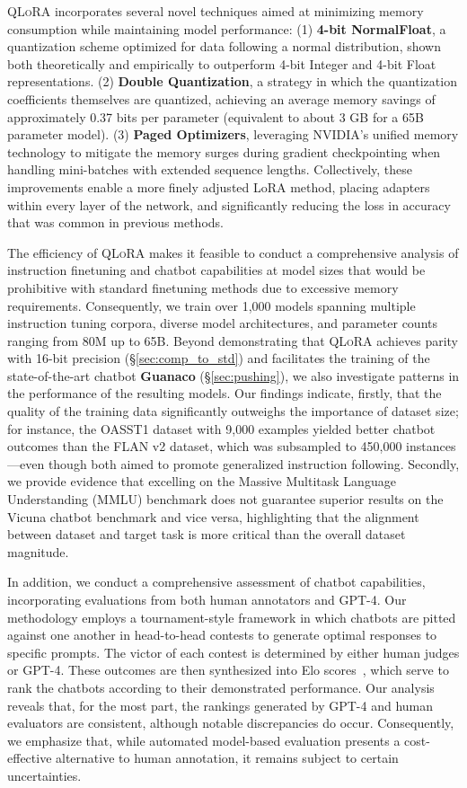 \textsc{QLoRA} incorporates several novel techniques aimed at minimizing memory consumption while maintaining model performance: (1) \textbf{4-bit NormalFloat}, a quantization scheme optimized for data following a normal distribution, shown both theoretically and empirically to outperform 4-bit Integer and 4-bit Float representations. (2) \textbf{Double Quantization}, a strategy in which the quantization coefficients themselves are quantized, achieving an average memory savings of approximately 0.37 bits per parameter (equivalent to about 3 GB for a 65B parameter model). (3) \textbf{Paged Optimizers}, leveraging NVIDIA’s unified memory technology to mitigate the memory surges during gradient checkpointing when handling mini-batches with extended sequence lengths. Collectively, these improvements enable a more finely adjusted LoRA method, placing adapters within every layer of the network, and significantly reducing the loss in accuracy that was common in previous methods.

The efficiency of \textsc{QLoRA} makes it feasible to conduct a comprehensive analysis of instruction finetuning and chatbot capabilities at model sizes that would be prohibitive with standard finetuning methods due to excessive memory requirements. Consequently, we train over 1,000 models spanning multiple instruction tuning corpora, diverse model architectures, and parameter counts ranging from 80M up to 65B. Beyond demonstrating that \textsc{QLoRA} achieves parity with 16-bit precision (\S\ref{sec:comp_to_std}) and facilitates the training of the state-of-the-art chatbot \textbf{Guanaco} (\S\ref{sec:pushing}), we also investigate patterns in the performance of the resulting models. Our findings indicate, firstly, that the quality of the training data significantly outweighs the importance of dataset size; for instance, the OASST1 dataset with 9,000 examples yielded better chatbot outcomes than the FLAN v2 dataset, which was subsampled to 450,000 instances—even though both aimed to promote generalized instruction following. Secondly, we provide evidence that excelling on the Massive Multitask Language Understanding (MMLU) benchmark does not guarantee superior results on the Vicuna chatbot benchmark and vice versa, highlighting that the alignment between dataset and target task is more critical than the overall dataset magnitude.

In addition, we conduct a comprehensive assessment of chatbot capabilities, incorporating evaluations from both human annotators and GPT-4. Our methodology employs a tournament-style framework in which chatbots are pitted against one another in head-to-head contests to generate optimal responses to specific prompts. The victor of each contest is determined by either human judges or GPT-4. These outcomes are then synthesized into Elo scores~\citep{elo1967proposed, elo1978rating}, which serve to rank the chatbots according to their demonstrated performance. Our analysis reveals that, for the most part, the rankings generated by GPT-4 and human evaluators are consistent, although notable discrepancies do occur. Consequently, we emphasize that, while automated model-based evaluation presents a cost-effective alternative to human annotation, it remains subject to certain uncertainties.

